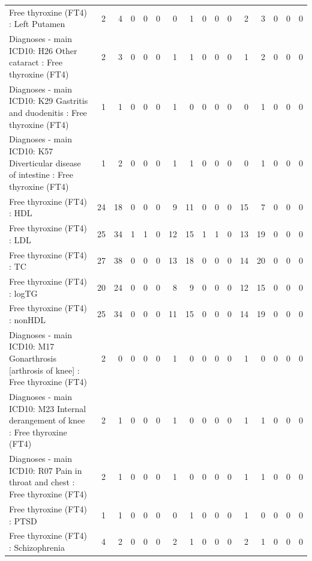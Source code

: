 \begin{table}[ht]
\begin{tabular}{lrrrrrrrrrrrrrrr}
  Free thyroxine (FT4) : Left Putamen &   2 &   4 &   0 &   0 &   0 &   0 &   1 &   0 &   0 &   0 &   2 &   3 &   0 &   0 &   0 \\ 
  Diagnoses - main ICD10: H26 Other cataract : Free thyroxine (FT4) &   2 &   3 &   0 &   0 &   0 &   1 &   1 &   0 &   0 &   0 &   1 &   2 &   0 &   0 &   0 \\ 
  Diagnoses - main ICD10: K29 Gastritis and duodenitis : Free thyroxine (FT4) &   1 &   1 &   0 &   0 &   0 &   1 &   0 &   0 &   0 &   0 &   0 &   1 &   0 &   0 &   0 \\ 
  Diagnoses - main ICD10: K57 Diverticular disease of intestine : Free thyroxine (FT4) &   1 &   2 &   0 &   0 &   0 &   1 &   1 &   0 &   0 &   0 &   0 &   1 &   0 &   0 &   0 \\ 
  Free thyroxine (FT4) : HDL &  24 &  18 &   0 &   0 &   0 &   9 &  11 &   0 &   0 &   0 &  15 &   7 &   0 &   0 &   0 \\ 
  Free thyroxine (FT4) : LDL &  25 &  34 &   1 &   1 &   0 &  12 &  15 &   1 &   1 &   0 &  13 &  19 &   0 &   0 &   0 \\ 
  Free thyroxine (FT4) : TC &  27 &  38 &   0 &   0 &   0 &  13 &  18 &   0 &   0 &   0 &  14 &  20 &   0 &   0 &   0 \\ 
  Free thyroxine (FT4) : logTG &  20 &  24 &   0 &   0 &   0 &   8 &   9 &   0 &   0 &   0 &  12 &  15 &   0 &   0 &   0 \\ 
  Free thyroxine (FT4) : nonHDL &  25 &  34 &   0 &   0 &   0 &  11 &  15 &   0 &   0 &   0 &  14 &  19 &   0 &   0 &   0 \\ 
  Diagnoses - main ICD10: M17 Gonarthrosis [arthrosis of knee] : Free thyroxine (FT4) &   2 &   0 &   0 &   0 &   0 &   1 &   0 &   0 &   0 &   0 &   1 &   0 &   0 &   0 &   0 \\ 
  Diagnoses - main ICD10: M23 Internal derangement of knee : Free thyroxine (FT4) &   2 &   1 &   0 &   0 &   0 &   1 &   0 &   0 &   0 &   0 &   1 &   1 &   0 &   0 &   0 \\ 
  Diagnoses - main ICD10: R07 Pain in throat and chest : Free thyroxine (FT4) &   2 &   1 &   0 &   0 &   0 &   1 &   0 &   0 &   0 &   0 &   1 &   1 &   0 &   0 &   0 \\ 
  Free thyroxine (FT4) : PTSD &   1 &   1 &   0 &   0 &   0 &   0 &   1 &   0 &   0 &   0 &   1 &   0 &   0 &   0 &   0 \\ 
  Free thyroxine (FT4) : Schizophrenia &   4 &   2 &   0 &   0 &   0 &   2 &   1 &   0 &   0 &   0 &   2 &   1 &   0 &   0 &   0 \\ 

\end{tabular}
\end{table}
